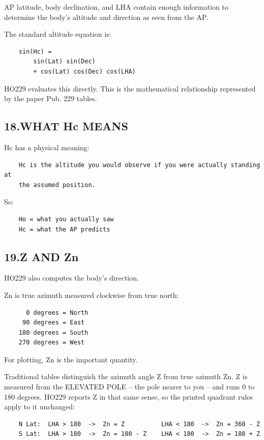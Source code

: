 \documentclass[11pt]{article}
\begin{document}
AP latitude, body declination, and LHA contain enough information to determine the body's altitude and direction as seen from the AP.

The standard altitude equation is:

\begin{verbatim}
    sin(Hc) =
        sin(Lat) sin(Dec)
        + cos(Lat) cos(Dec) cos(LHA)
\end{verbatim}

HO229 evaluates this directly. This is the mathematical relationship represented by the paper Pub. 229 tables.

\subsection*{18.\quad WHAT Hc MEANS}

Hc has a physical meaning:

\begin{verbatim}
    Hc is the altitude you would observe if you were actually standing at
    the assumed position.
\end{verbatim}

So:

\begin{verbatim}
    Ho = what you actually saw
    Hc = what the AP predicts
\end{verbatim}

\subsection*{19.\quad Z AND Zn}

HO229 also computes the body's direction.

Zn is true azimuth measured clockwise from true north:

\begin{verbatim}
      0 degrees = North
     90 degrees = East
    180 degrees = South
    270 degrees = West
\end{verbatim}

For plotting, Zn is the important quantity.

Traditional tables distinguish the azimuth angle Z from true azimuth Zn. Z is measured from the ELEVATED POLE -- the pole nearer to you -- and runs 0 to 180 degrees. HO229 reports Z in that same sense, so the printed quadrant rules apply to it unchanged:

\begin{verbatim}
    N Lat:  LHA > 180  ->  Zn = Z          LHA < 180  ->  Zn = 360 - Z
    S Lat:  LHA > 180  ->  Zn = 180 - Z    LHA < 180  ->  Zn = 180 + Z
\end{verbatim}
\end{document}
